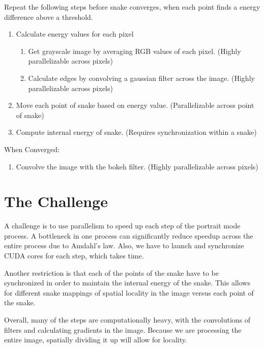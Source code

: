 \documentclass[12pt]{article}
\begin{document}
Repeat the following steps before snake converges, when each point finds a
energy difference above a threshold.
\begin{enumerate}
    \item
        Calculate energy values for each pixel
            \begin{enumerate}
                \item
                    Get grayscale image by averaging RGB values of each pixel.
                    (Highly parallelizable across pixels)
                \item
                    Calculate edges by convolving a gaussian filter across the
                    image. (Highly parallelizable across pixels)
            \end{enumerate}
    \item
        Move each point of snake based on energy value. (Parallelizable across
        point of snake)
    \item
        Compute internal energy of snake. (Requires synchronization within a
        snake)
\end{enumerate}

When Converged:
\begin{enumerate}
    \item
        Convolve the image with the bokeh filter. (Highly parallelizable across
        pixels)
\end{enumerate}

\section*{The Challenge}

A challenge is to use parallelism to speed up each step of the portrait mode
process. A bottleneck in one process can significantly reduce speedup across
the entire process due to Amdahl's law. Also, we have to launch
and synchronize CUDA cores for each step, which takes time.

Another restriction is that each of the points of the snake have to be
synchronized in order to maintain the internal energy of the snake. This allows
for different snake mappings of spatial locality in the image versus each point
of the snake.

Overall, many of the steps are computationally heavy, with the convolutions
of filters and calculating gradients in the image. Because we are processing
the entire image, spatially dividing it up will allow for locality.
\end{document}
